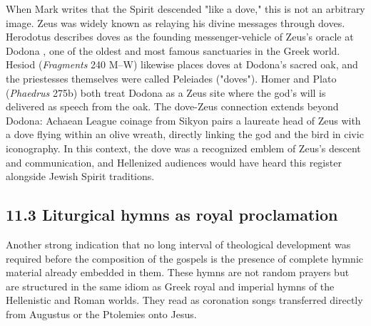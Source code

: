 When Mark writes that the Spirit descended "like a dove," this is not an arbitrary image.
Zeus was widely known as relaying his divine messages through doves.
Herodotus describes doves as the founding messenger-vehicle of Zeus's oracle at Dodona \cite[2.55--57]{herodotus:histories}, one of the oldest and most famous sanctuaries in the Greek world.
Hesiod (\emph{Fragments} 240 M--W) likewise places doves at Dodona's sacred oak, and the priestesses themselves were called Peleiades ("doves").
Homer \cite[16.233]{homer:iliad} and Plato (\emph{Phaedrus} 275b) both treat Dodona as a Zeus site where the god's will is delivered as speech from the oak.
The dove-Zeus connection extends beyond Dodona: Achaean League coinage from Sikyon pairs a laureate head of Zeus with a dove flying within an olive wreath, directly linking the god and the bird in civic iconography.
In this context, the dove was a recognized emblem of Zeus's descent and communication, and Hellenized audiences would have heard this register alongside Jewish Spirit traditions.

\subsection{11.3 Liturgical hymns as royal proclamation}\label{subsec:liturgical-hymns-as-royal-proclamation}

Another strong indication that no long interval of theological development was required before the composition of the gospels is the presence of complete hymnic material already embedded in them.
These hymns are not random prayers but are structured in the same idiom as Greek royal and imperial hymns of the Hellenistic and Roman worlds.
They read as coronation songs transferred directly from Augustus or the Ptolemies onto Jesus.

